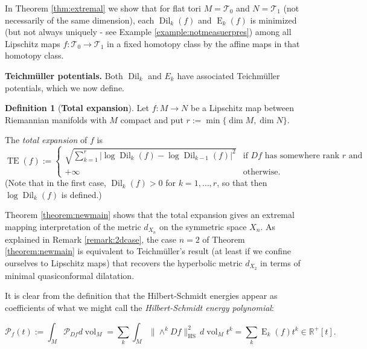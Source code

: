 \documentclass[11pt,letterpaper]{amsart}
\theoremstyle{definition}
\newtheorem{definition}[theorem]{Definition}
\numberwithin{equation}{section}
\theoremstyle{definition}
\newcommand{\Tc}{\mathcal{T}}
\newcommand{\Pc}{\mathcal{P}}
\newcommand{\Rb}{\mathbb{R}}
\DeclareMathOperator{\En}{E}
\DeclareMathOperator{\HS}{HS}
\DeclareMathOperator{\TE}{TE}
\newcommand{\Dil}{\operatorname{Dil}}
\newcommand{\vol}{\operatorname{vol}}
\begin{document}
In Theorem \ref{thm:extremal} we show that for flat tori $M=\Tc_0$ and $N=\Tc_1$ (not necessarily of the same dimension),  each  $\Dil_k(f)$ and $\En_k(f)$  is minimized (but not always uniquely - see Example \ref{example:notmeasuerpres}) among all Lipschitz maps $f:\Tc_0\to \Tc_1$ in a fixed homotopy class by the affine maps in that homotopy class. 

\medskip
\noindent
{\bf Teichm\"uller potentials.}
Both $\Dil_k$ and $E_k$ have associated Teichm\"uller potentials, which we now define.

\begin{definition}[{\bf Total expansion}]\label{def:stretch}
Let $f:M\to N$ be a Lipschitz map between Riemannian manifolds with $M$ compact and put  $r:=\min\{\dim M,\dim N\}$. 

The {\em total expansion} of 
$f$ is
\[
\textstyle \TE(f):=
\begin{cases}
\sqrt{\sum_{k=1}^r\big|\log\Dil_k(f)-\log\Dil_{k-1}(f)\big|^2} &\text{if  $Df$ has somewhere rank $r$ and}\\
+\infty & \text{otherwise.}
\end{cases}
\]
(Note that in the first case, $\Dil_k(f)>0$ for $k=1, \dots, r$, so that then $\log \Dil_k(f)$ is defined.)
\end{definition}


Theorem \ref{theorem:newmain} shows that the total expansion  gives an extremal mapping interpretation of the metric $d_{X_n}$ on the symmetric space $X_n$.  As explained in 
Remark \ref{remark:2dcase}, the case $n=2$ of Theorem \ref{theorem:newmain} is equivalent 
to Teichm\"{u}ller's result  (at least if we confine ourselves to Lipschitz maps) that recovers  the hyperbolic metric $d_{X_2}$ in terms of 
minimal quasiconformal dilatation.  
\smallskip

It is clear from the definition that the Hilbert-Schmidt energies appear as coefficients of what we might call the 
\emph{Hilbert-Schmidt energy polynomial}:

\[
\textstyle \Pc_f(t):=\int_M \Pc_{Df} d\!\vol_M =\sum_k \int_M\|\wedge^k Df\|^2_{\HS}\, d\!\vol_Mt^k = 
\sum_k  \En_k(f) t^k\in \Rb^+[t].
\]
\end{document}
